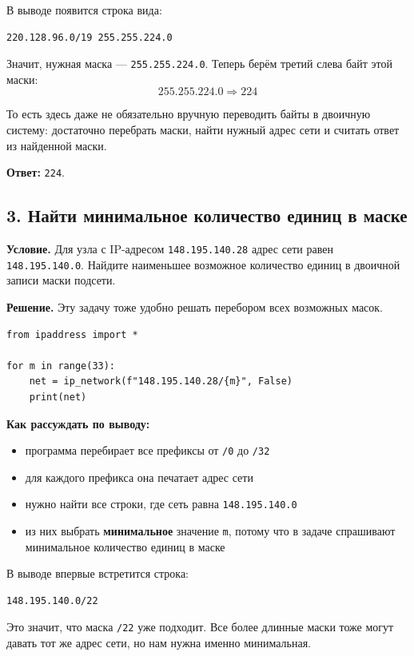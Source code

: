 \documentclass[11pt]{article}
\begin{document}
В выводе появится строка вида:
\begin{verbatim}
220.128.96.0/19 255.255.224.0
\end{verbatim}

Значит, нужная маска --- \texttt{255.255.224.0}. Теперь берём третий слева байт этой маски:
\[
255.255.224.0 \Rightarrow 224
\]

То есть здесь даже не обязательно вручную переводить байты в двоичную систему: достаточно перебрать маски, найти нужный адрес сети и считать ответ из найденной маски.

\textbf{Ответ:} \texttt{224}.

\subsection*{3. Найти минимальное количество единиц в маске}

\textbf{Условие.} Для узла с IP-адресом \texttt{148.195.140.28} адрес сети равен \texttt{148.195.140.0}. Найдите наименьшее возможное количество единиц в двоичной записи маски подсети.

\textbf{Решение.} Эту задачу тоже удобно решать перебором всех возможных масок.

\begin{verbatim}
from ipaddress import *

for m in range(33):
    net = ip_network(f"148.195.140.28/{m}", False)
    print(net)
\end{verbatim}

\textbf{Как рассуждать по выводу:}
\begin{itemize}
  \item программа перебирает все префиксы от \texttt{/0} до \texttt{/32}
  \item для каждого префикса она печатает адрес сети
  \item нужно найти все строки, где сеть равна \texttt{148.195.140.0}
  \item из них выбрать \textbf{минимальное} значение \texttt{m}, потому что в задаче спрашивают минимальное количество единиц в маске
\end{itemize}

В выводе впервые встретится строка:
\begin{verbatim}
148.195.140.0/22
\end{verbatim}

Это значит, что маска \texttt{/22} уже подходит. Все более длинные маски тоже могут давать тот же адрес сети, но нам нужна именно минимальная.
\end{document}
